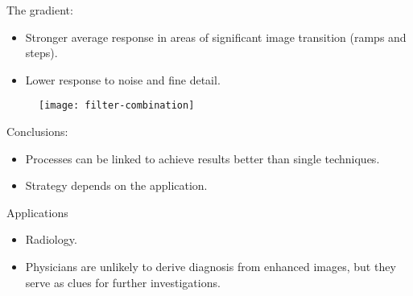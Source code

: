 
\begin{frame}
The gradient:
\begin{itemize}
\item Stronger average response in areas of significant image transition (ramps and steps).
\item Lower response to noise and fine detail.
\end{itemize}
\end{frame}


\begin{frame}
\begin{figure}
\centering
\texttt{[image: filter-combination]}
\end{figure}
\end{frame}




\begin{frame}
Conclusions:
\begin{itemize}
\item Processes can be linked to achieve results better than single techniques.
\item Strategy depends on the application.
\end{itemize}
Applications
\begin{itemize}
\item Radiology.
\item Physicians are unlikely to derive diagnosis from enhanced images, but they serve as clues for further investigations.
\end{itemize}
\end{frame}


